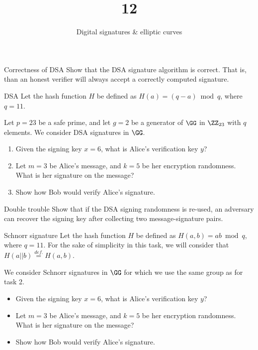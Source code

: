 \documentclass{practice}
\title{12}
\subtitle{Digital signatures \& elliptic curves}
\date{\DTMdate{2024-11-27}}
\begin{document}
\maketitle

\begin{task}{Correctness of DSA}
  Show that the DSA signature algorithm is correct.
  That is, than an honest verifier will always accept a correctly computed signature.
\end{task}

\begin{task}{DSA}
  Let the hash function $H$ be defined as $H(a) = (q - a) \bmod{q}$, where $q = 11$.

  Let $p = 23$ be a safe prime, and let $g = 2$ be a generator of $\GG$ in $\ZZ_{23}$ with $q$ elements.
  We consider DSA signatures in $\GG$.
  \begin{enumerate}
    \item Given the signing key $x = 6$, what is Alice's verification key $y$?
    \item Let $m = 3$ be Alice's message, and $k = 5$ be her encryption randomness.
    What is her signature on the message?
    \item Show how Bob would verify Alice's signature.
  \end{enumerate}
\end{task}

\begin{task}{Double trouble}
  Show that if the DSA signing randomness is re-used, an adversary can recover the signing key after collecting two message-signature pairs.
\end{task}

\begin{task}{Schnorr signature}
  Let the hash function $H$ be defined as $H(a,b) = ab \bmod{q}$, where $q = 11$.
  For the sake of simplicity in this task, we will consider that $H(a||b) \stackrel{\mathit{def.}}{=} H(a, b)$.

  We consider Schnorr signatures in $\GG$ for which we use the same group as for task 2.
  \begin{itemize}
    \item Given the signing key $x = 6$, what is Alice's verification key $y$?
    \item Let $m = 3$ be Alice's message, and $k = 5$ be her encryption randomness.
    What is her signature on the message?
    \item Show how Bob would verify Alice's signature.
  \end{itemize}
\end{task}
\end{document}
